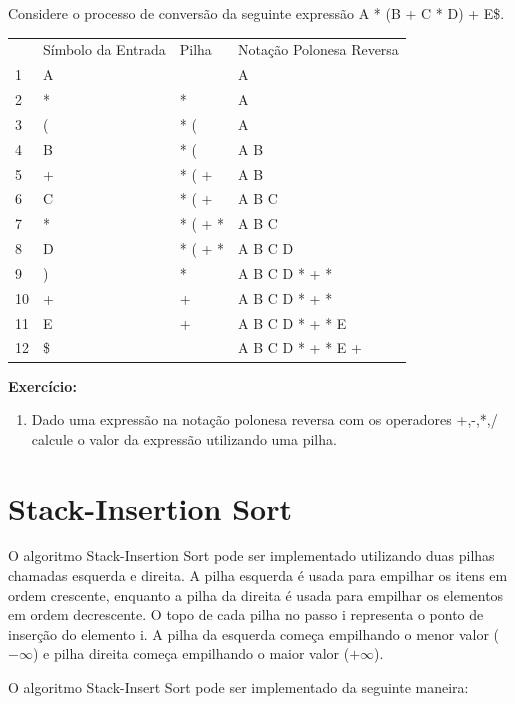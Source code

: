 \begin{exemplo}
Considere o processo de conversão da seguinte expressão A * (B + C * D) + E\$.

\begin{tabular}{llll}
  &Símbolo da Entrada    & Pilha  & Notação Polonesa Reversa \\
1 & A     &    & A \\
2 & *     & *  & A \\
3 & (     & * ( & A \\
4 & B     & * (  & A B\\
5 & +     & * ( +  & A B\\
6 & C     & * ( +   & A B C\\
7 & *     & * ( + *   & A B C\\
8 & D     & * ( + *   & A B C D\\
9 & )     & *    & A B C D * + *\\
10 & +    & +    & A B C D * + * \\
11 & E    & +    & A B C D * + * E\\ 
12 & \$   &     & A B C D * + * E +\\ 

\end{tabular}


\end{exemplo}


\textbf{Exercício:}

\begin{enumerate}
    \item Dado uma expressão na notação polonesa reversa com os operadores +,-,*,/ calcule o valor da expressão utilizando uma pilha.
\end{enumerate}




\section{Stack-Insertion Sort}

O algoritmo Stack-Insertion Sort pode ser implementado utilizando duas pilhas chamadas esquerda e direita. A pilha esquerda é usada para empilhar os itens em ordem crescente, enquanto a pilha da direita é usada para empilhar os elementos em ordem decrescente. O topo de cada pilha no passo i representa o ponto de inserção do elemento i. A pilha da esquerda começa empilhando o menor valor ($-\infty$) e pilha direita começa empilhando o maior valor ($+ \infty$).  


O algoritmo Stack-Insert Sort pode ser implementado da seguinte maneira:

